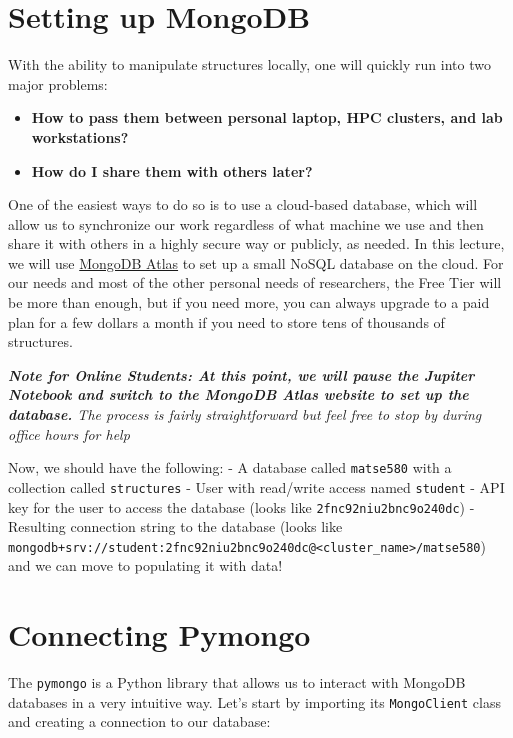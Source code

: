 \hypertarget{setting-up-mongodb}{%
\section{Setting up MongoDB}\label{pysipfenntutorial:setting-up-mongodb}}

With the ability to manipulate structures locally, one will quickly run
into two major problems:

\begin{itemize}
\item
  \textbf{How to pass them between personal laptop, HPC clusters, and
  lab workstations?}
\item
  \textbf{How do I share them with others later?}
\end{itemize}

One of the easiest ways to do so is to use a cloud-based database, which
will allow us to synchronize our work regardless of what machine we use
and then share it with others in a highly secure way or publicly, as
needed. In this lecture, we will use
\href{https://www.mongodb.com/atlas}{MongoDB Atlas} to set up a small
NoSQL database on the cloud. For our needs and most of the other
personal needs of researchers, the Free Tier will be more than enough,
but if you need more, you can always upgrade to a paid plan for a few
dollars a month if you need to store tens of thousands of structures.

\emph{\textbf{Note for Online Students: At this point, we will pause the
Jupiter Notebook and switch to the MongoDB Atlas website to set up the
database.} The process is fairly straightforward but feel free to stop
by during office hours for help}

Now, we should have the following: - A database called
\texttt{matse580} with a collection called
\texttt{structures} - User with read/write access named
\texttt{student} - API key for the user to access the
database (looks like \texttt{2fnc92niu2bnc9o240dc}) -
Resulting connection string to the database (looks like
\texttt{mongodb+srv://student:2fnc92niu2bnc9o240dc@<cluster\_name>/matse580})
and we can move to populating it with data!

\hypertarget{pymongo}{%
\section{Connecting Pymongo}\label{pysipfenntutorial:pymongo}}


The \texttt{pymongo} is a Python library that allows us
to interact with MongoDB databases in a very intuitive way. Let's start
by importing its \texttt{MongoClient} class and
creating a connection to our database:

